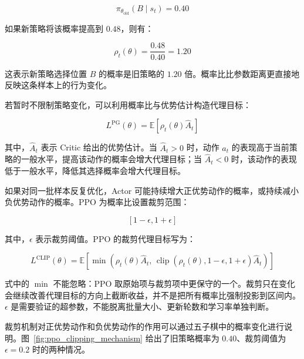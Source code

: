 \documentclass[UTF8,a4paper,zihao=-4,oneside,openany]{ctexbook}
\begin{document}
\[
\pi_{\theta_{\mathrm{old}}}(B\mid s_t)=0.40
\]

如果新策略将该概率提高到 $0.48$，则有：

\begin{equation}
\rho_t(\theta)
=
\frac{0.48}{0.40}
=
1.20
\end{equation}

这表示新策略选择位置 $B$ 的概率是旧策略的 $1.20$ 倍。概率比比参数距离更直接地反映这条样本上的行为变化。

若暂时不限制策略变化，可以利用概率比与优势估计构造代理目标：

\begin{equation}
L^{\mathrm{PG}}(\theta)
=
\mathbb{E}
\left[
\rho_t(\theta)\widehat{A}_t
\right]
\end{equation}

其中，$\widehat{A}_t$ 表示 Critic 给出的优势估计。当 $\widehat{A}_t>0$ 时，动作 $a_t$ 的表现高于当前策略的一般水平，提高该动作的概率会增大代理目标；当 $\widehat{A}_t<0$ 时，该动作的表现低于一般水平，降低其选择概率会增大代理目标。

如果对同一批样本反复优化，Actor 可能持续增大正优势动作的概率，或持续减小负优势动作的概率。PPO 为概率比设置裁剪范围：

\[
[1-\epsilon,1+\epsilon]
\]

其中，$\epsilon$ 表示裁剪阈值。PPO 的裁剪代理目标写为：

\begin{equation}
L^{\mathrm{CLIP}}(\theta)
=
\mathbb{E}
\left[
\min
\left(
\rho_t(\theta)\widehat{A}_t,\,
\operatorname{clip}
\left(
\rho_t(\theta),
1-\epsilon,
1+\epsilon
\right)
\widehat{A}_t
\right)
\right]
\end{equation}

式中的 $\min$ 不能忽略：PPO 取原始项与裁剪项中更保守的一个。裁剪只在变化会继续改善代理目标的方向上截断收益，并不是把所有概率比强制投影到区间内。$\epsilon$ 是需要验证的超参数，不能脱离批量大小、更新轮数和学习率单独判断。

裁剪机制对正优势动作和负优势动作的作用可以通过五子棋中的概率变化进行说明。图~\ref{fig:ppo_clipping_mechanism} 给出了旧策略概率为 $0.40$、裁剪阈值为 $\epsilon=0.2$ 时的两种情况。

%       
\end{document}

